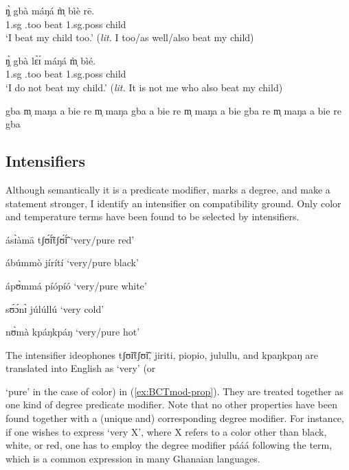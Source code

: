 \begin{exe}
\begin{exe}
\begin{exe}
{\begin{exe}
\begin{exe}
\begin{exe}
\begin{exe}
\begin{exe}
\begin{exe}
\begin{exe}
\begin{exe}
\begin{exe}
\ea\label{ex:GRM-too}

 \ea\label{ex:GRM-too-pos}
\gll ŋ̩̀ gbà máŋá m̩̀ bìè rē.\\
{\sc 1.sg} {\quant}.too  beat {\sc 1.sg.poss}  child {\foc}\\
\glt  `I beat my child too.' ({\it lit.} I too/as well/also beat my
child)

 \ex\label{ex:GRM-too-neg}
\gll ŋ̩̀ gbà lɛ̀ɪ́ máŋá  m̩̀ bìé.\\
{\sc 1.sg} {\quant}.too  {\neg} beat {\sc 1.sg.poss}  child\\
\glt  `I do not beat my child.' ({\it lit.} It is not me who  also
beat my child)


 \ex\label{ex:GRM-too-out-1}   \textasteriskcentered  gba m̩  maŋa a bie re
\ex \textasteriskcentered  m̩ maŋa gba a bie re
 \ex \textasteriskcentered  m̩ maŋa  a bie gba re
 \ex\label{ex:GRM-too-out-4} \textasteriskcentered  m̩ maŋa  a bie  re gba

\z 
 \z

\subsection{Intensifiers}
\label{sec:GRM-intensifier}

Although semantically it is a predicate modifier, marks a degree,  and make a 
statement stronger, I identify an intensifier on compatibility ground. Only 
color   and temperature terms have been found to be selected 
by intensifiers.


\ea\label{ex:intens-ideo} 

\ea  ásɪ̀àmā tʃʊ̃́ɪ̃́tʃʊ̃́ɪ̃́   {\rm `very/pure  red'}
\label{ex:BCTmod-prop-red}

\ex ábúmmò jírítí {\rm `very/pure black'}
\label{ex:BCTmod-prop-black} 

\ex  ápʊ̀mmá píópíó  {\rm `very/pure  white'}
\label{ex:BCTmod-prop-white}

\ex  sʊ́ɔ́nɪ̀ júlúllú  {\rm `very cold'}
\label{ex:BCTmod-prop-cold}

\ex   nʊ̀mà kpáŋkpáŋ  {\rm `very/pure hot'}
\label{ex:BCTmod-prop-hot}


\z
\z

The  intensifier ideophones  {\sls tʃʊ̃ɪ̃tʃʊ̃ɪ̃},  {\sls jiriti},  {\sls 
piopio},  
{\sls julullu},  and {\sls kpaŋkpaŋ} are translated into English as `very' 
(or 
 
`pure' in the case of color) in (\ref{ex:BCTmod-prop}). They are treated 
together as one kind of degree predicate modifier.  Note that no other 
properties have been found together with a (unique and) corresponding degree 
modifier. For instance, if one wishes to express `very X', where X refers to a 
color other than black, white, or red,   one has to employ the degree modifier 
{\sls pááá} following the term, which is a common expression in many 
Ghanaian 
languages. 



\end{exe}
\end{exe}
\end{exe}
\end{exe}
\end{exe}
\end{exe}
\end{exe}
\end{exe}
\end{exe}}
\end{exe}
\end{exe}
\end{exe}
